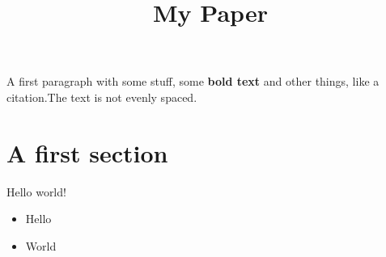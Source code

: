 \documentclass{article}
\begin{document}
\title{My Paper}
\maketitle

A first paragraph with some stuff, some \textbf{bold text}   and other things, like a \cite{my:paper} citation.The text is  not evenly spaced.

\section{A first section}

Hello world!

\begin{itemize}
\item Hello %
\item   World
\end{itemize}
\end{document}
